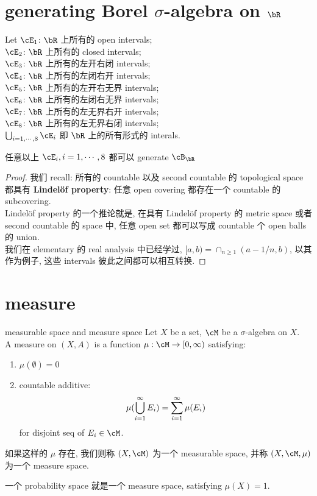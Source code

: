 \documentclass[lang=cn,11pt]{elegantbook}
\begin{document}
\section{generating Borel $\sigma$-algebra on $\bR$}
\begin{example}
    Let
    $\cE_1 $: $\bR$ 上所有的 open intervals; \\ 
    $\cE_2 $: $\bR$ 上所有的 closed intervals;\\
    $\cE_3 $: $\bR$ 上所有的左开右闭 intervals;\\
    $\cE_4 $: $\bR$ 上所有的左闭右开 intervals;\\
    $\cE_5 $: $\bR$ 上所有的左开右无界 intervals;\\
    $\cE_6 $: $\bR$ 上所有的左闭右无界 intervals;\\
    $\cE_7 $: $\bR$ 上所有的左无界右开 intervals;\\
    $\cE_8 $: $\bR$ 上所有的左无界右闭 intervals;\\
    $\union_{i=1,\cdots,8}\cE_i$ 即 $\bR$ 上的所有形式的 interals.
\begin{lemma}
    任意以上 $\cE_i, i=1,\cdots,8$ 都可以 generate $\cB_{\bR}$
\end{lemma}
\begin{proof}
    我们 recall: 所有的 countable 以及 second countable 的 topological space 都具有 \textbf{Lindelöf property}: 任意 open covering 都存在一个 countable 的 subcovering.\\
    Lindelöf property 的一个推论就是, 在具有 Lindelöf property 的 metric space 或者 second countable 的 space 中, 任意 open set 都可以写成 countable 个 open balls 的 union.\\
    我们在 elementary 的 real analysis 中已经学过, $[a,b) = \cap_{n \geq 1}(a-1/n, b)$, 以其作为例子, 这些 intervals 彼此之间都可以相互转换.
\end{proof}
\end{example}




\section{measure}
\begin{definition}{measurable space and measure space}
    Let $X$ be a set, $\cM$ be a $\sigma$-algebra on $X$.\\
    A measure on $(X,A)$ is a function $\mu: \cM \rar [0, \infty)$ satisfying:
    \begin{enumerate}
        \item $\mu(\emptyset) = 0$
        \item countable additive: 
        $$
        \mu(\bigcup_{i=1}^\infty E_i) = \sum_{i=1}^{\infty} \mu(E_i)  
        $$ for disjoint seq of $E_i \in \cM$.
    \end{enumerate}

    如果这样的 $\mu$ 存在, 我们则称 $(X,\cM)$ 为一个 measurable space, 并称 $(X,\cM, \mu)$ 为一个 measure space.
\end{definition}
\begin{remark}
    一个 probability space 就是一个 measure space, satisfying $\mu(X) = 1$.
\end{remark}
\end{document}
